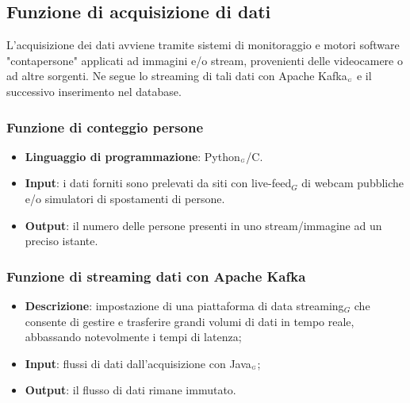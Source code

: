 \subsection{Funzione di acquisizione di dati}\label{DescrizioneGeneraleFunzionalitàDelProdottoFunzioneDiAcquisizioneDiDati}
L'acquisizione dei dati avviene tramite sistemi di monitoraggio e motori software "contapersone" applicati ad immagini e/o stream, provenienti delle videocamere o ad altre sorgenti. Ne segue lo streaming di tali dati con Apache Kafka$_{\scaleto{G}{3pt}}$ e il successivo inserimento nel database.

\subsubsection{Funzione di conteggio persone}\label{DescrizioneGeneraleFunzionalitàDelProdottoFunzioneDiAcquisizioneDiDatiFunzioneDiConteggioPersone}
\begin{itemize}
\item \textbf{Linguaggio di programmazione}: Python$_{\scaleto{G}{3pt}}$/C.
\item \textbf{Input}: i dati forniti sono prelevati da siti con live-feed$_G$ di webcam pubbliche e/o simulatori di spostamenti di persone.
\item \textbf{Output}: il numero delle persone presenti in uno stream/immagine ad un preciso istante.
\end{itemize}

\subsubsection{Funzione di streaming dati con Apache Kafka}\label{DescrizioneGeneraleFunzionalitàDelProdottoFunzioneDiAcquisizioneDiDatiFunzioneDiStreamingDatiConApacheKafka}

\begin{itemize}
	\item \textbf{Descrizione}: impostazione di una piattaforma di data streaming$_G$ che consente di gestire e trasferire grandi volumi di dati in tempo reale, abbassando notevolmente i tempi di latenza;
	\item \textbf{Input}: flussi di dati dall'acquisizione con Java$_{\scaleto{G}{3pt}}$;
		\item \textbf{Output}: il flusso di dati rimane immutato.
\end{itemize}

